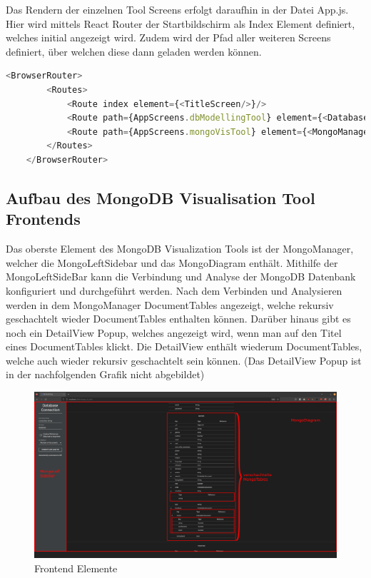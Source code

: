 Das Rendern der einzelnen Tool Screens erfolgt daraufhin in der Datei App.js.
Hier wird mittels React Router der Startbildschirm als Index Element definiert, welches initial angezeigt wird.
Zudem wird der Pfad aller weiteren Screens definiert, über welchen diese dann geladen werden können.

\begin{lstlisting}[language=JavaScript, caption={React Router in App.js},label={lst:app.js}]
    <BrowserRouter>
        <Routes>
            <Route index element={<TitleScreen/>}/>
            <Route path={AppScreens.dbModellingTool} element={<DatabaseModellingTool/>}/>
            <Route path={AppScreens.mongoVisTool} element={<MongoManager/>}/>
        </Routes>
    </BrowserRouter>
\end{lstlisting}

\subsection{Aufbau des MongoDB Visualisation Tool Frontends}
\label{sub:fe_aufbau}
Das oberste Element des MongoDB Visualization Tools ist der MongoManager, welcher die MongoLeftSidebar und das MongoDiagram enthält.
Mithilfe der MongoLeftSideBar kann die Verbindung und Analyse der MongoDB Datenbank konfiguriert und durchgeführt werden.
Nach dem Verbinden und Analysieren werden in dem MongoManager DocumentTables angezeigt, welche rekursiv geschachtelt wieder DocumentTables enthalten können.
Darüber hinaus gibt es noch ein DetailView Popup, welches angezeigt wird, wenn man auf den Titel eines DocumentTables klickt.
Die DetailView enthält wiederum DocumentTables, welche auch wieder rekursiv geschachtelt sein können.
(Das DetailView Popup ist in der nachfolgenden Grafik nicht abgebildet)

\begin{figure}[H]
    \includegraphics[width=\textwidth]{images/frontend_layers}
    \caption{Frontend Elemente}
    \label{fig:frontend_layers}
\end{figure}

